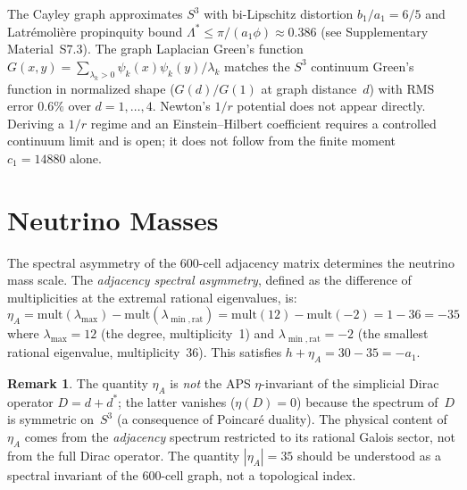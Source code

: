 \documentclass[12pt,a4paper]{article}
\theoremstyle{definition}
\newtheorem{remark}{Remark}
\begin{document}
The Cayley graph approximates $S^3$ with bi-Lipschitz distortion $b_1/a_1 = 6/5$ and Latr\'emoli\`ere propinquity bound $\Lambda^* \leq \pi/(a_1\phi) \approx 0.386$ (see Supplementary Material~S7.3).  The graph Laplacian Green's function $G(x,y) = \sum_{\lambda_k > 0} \psi_k(x)\psi_k(y)/\lambda_k$ matches the $S^3$ continuum Green's function in normalized shape ($G(d)/G(1)$ at graph distance~$d$) with RMS error $0.6\%$ over $d = 1, \ldots, 4$.  Newton's $1/r$ potential does not appear directly.  Deriving a $1/r$ regime and an Einstein--Hilbert coefficient requires a controlled continuum limit and is open; it does not follow from the finite moment $c_1=14880$ alone.

\section{Neutrino Masses}
\label{sec:neutrinos}

The spectral asymmetry of the 600-cell adjacency matrix determines the neutrino mass scale. The \emph{adjacency spectral asymmetry}, defined as the difference of multiplicities at the extremal rational eigenvalues, is:
\begin{equation}
\eta_A = \text{mult}(\lambda_{\max}) - \text{mult}(\lambda_{\min,\text{rat}}) = \text{mult}(12) - \text{mult}(-2) = 1 - 36 = -35
\end{equation}
where $\lambda_{\max} = 12$ (the degree, multiplicity~1) and $\lambda_{\min,\text{rat}} = -2$ (the smallest rational eigenvalue, multiplicity~36).  This satisfies $h + \eta_A = 30 - 35 = -a_1$.

\begin{remark}
The quantity $\eta_A$ is \emph{not} the APS $\eta$-invariant of the simplicial Dirac operator $D = d + d^*$; the latter vanishes ($\eta(D) = 0$) because the spectrum of~$D$ is symmetric on~$S^3$ (a consequence of Poincar\'e duality).  The physical content of~$\eta_A$ comes from the \emph{adjacency} spectrum restricted to its rational Galois sector, not from the full Dirac operator.  The quantity $|\eta_A| = 35$ should be understood as a spectral invariant of the 600-cell graph, not a topological index.
\end{remark}
\end{document}
